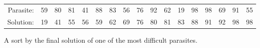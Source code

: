 \documentclass[11pt]{article}
\begin{document}
\begin{figure}[H]
  \begin{small}
    \begin{center}
      \begin{tabular}{rcccccccccccccccc}
        Parasite: & 59 & 80 & 81 & 41 & 88 & 83 & 56 & 76 & 92 & 62 & 19 & 98 & 98 & 69 & 91 & 55 \\
        Solution: & 19 & 41 & 55 & 56 & 59 & 62 & 69 & 76 & 80 & 81 & 83 & 88 & 91 & 92 & 98 & 98 \\
      \end{tabular}
    \end{center}
  \end{small}
  \caption{A sort by the final solution of one of the most difficult parasites.}
\end{figure}


\end{document}
